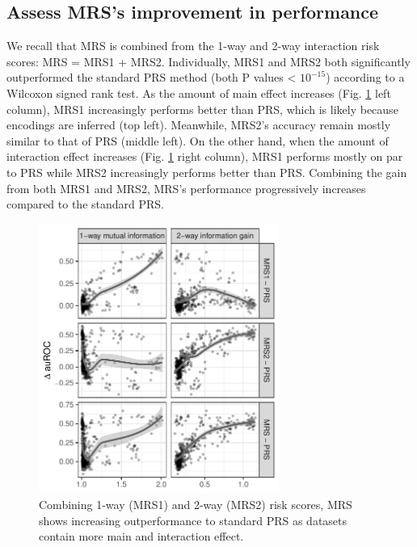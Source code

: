 \documentclass{ws-procs11x85}
\begin{document}
\hypertarget{assess-improvement-in-performance}{%
\subsection{Assess MRS's improvement in
performance}\label{assess-improvement-in-performance}}

We recall that MRS is combined from the 1-way and 2-way interaction risk scores: MRS = MRS1 + MRS2.
Individually, MRS1 and MRS2 both significantly outperformed the standard
PRS method (both P values \textless{} \(10^{-15}\)) according to a
Wilcoxon signed rank test. As the amount of main effect increases (Fig.
\ref{fig:improvements} left column), MRS1 increasingly performs better
than PRS, which is likely because encodings are inferred (top left).
Meanwhile, MRS2's accuracy remain mostly similar to that of PRS (middle
left). On the other hand, when the amount of interaction effect
increases (Fig. \ref{fig:improvements} right column), MRS1 performs
mostly on par to PRS while MRS2 increasingly performs better than PRS.
Combining the gain from both MRS1 and MRS2, MRS's performance
progressively increases compared to the standard PRS.

\begin{figure}
\centering
\includegraphics[width=0.7\textwidth]{../content/images/improvements_train_ms.pdf}
\caption{Combining 1-way (MRS1) and 2-way (MRS2) risk scores, MRS shows
increasing outperformance to standard PRS as datasets contain more main
and interaction effect.\label{fig:improvements}}
\end{figure}
\end{document}

